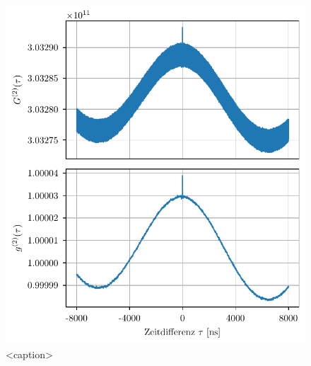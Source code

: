 \begin{figure}[htbp]
    \centering
    \includegraphics{images/Datenaufnahme/G2_vs_g2.pdf}
    \caption{<caption>}
    \label{<label>}
\end{figure}